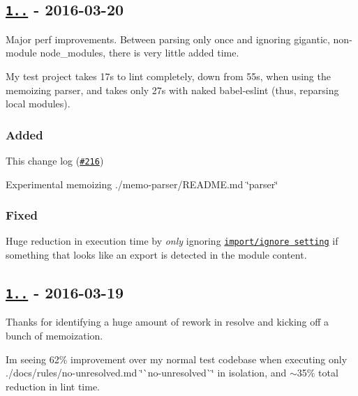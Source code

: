 \subsection*{\href{https://github.com/benmosher/eslint-plugin-import/compare/v1.2.0...v1.3.0}{\tt 1..} -\/ 2016-\/03-\/20}

Major perf improvements. Between parsing only once and ignoring gigantic, non-\/module {\ttfamily node\+\_\+modules}, there is very little added time.

My test project takes 17s to lint completely, down from 55s, when using the memoizing parser, and takes only 27s with naked {\ttfamily babel-\/eslint} (thus, reparsing local modules).

\subsubsection*{Added}


\begin{DoxyItemize}
\item This change log (\href{https://github.com/benmosher/eslint-plugin-import/issues/216}{\tt \#216})
\item Experimental memoizing ./memo-\/parser/\+R\+E\+A\+D\+ME.md \char`\"{}parser\char`\"{}
\end{DoxyItemize}

\subsubsection*{Fixed}


\begin{DoxyItemize}
\item Huge reduction in execution time by {\itshape only} ignoring \href{./README.md#importignore}{\tt {\ttfamily import/ignore} setting} if something that looks like an {\ttfamily export} is detected in the module content.
\end{DoxyItemize}

\subsection*{\href{https://github.com/benmosher/eslint-plugin-import/compare/v1.1.0...v1.2.0}{\tt 1..} -\/ 2016-\/03-\/19}

Thanks  for identifying a huge amount of rework in resolve and kicking off a bunch of memoization.

I\textquotesingle{}m seeing 62\% improvement over my normal test codebase when executing only ./docs/rules/no-\/unresolved.md \char`\"{}\`{}no-\/unresolved\`{}\char`\"{} in isolation, and $\sim$35\% total reduction in lint time.

